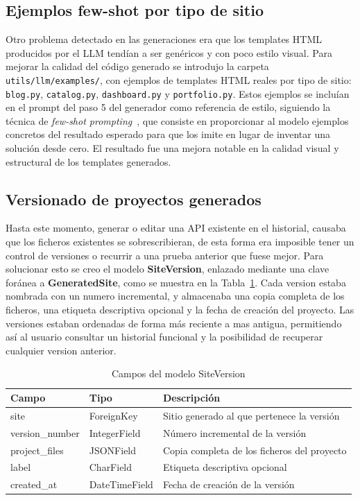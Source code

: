 \subsection{Ejemplos few-shot por tipo de sitio}
\label{subsec:ejemplos-fewshot}

Otro problema detectado en las generaciones era que los templates HTML producidos por el LLM tendían a ser genéricos y con poco estilo visual. Para mejorar la calidad del código generado se introdujo la carpeta \texttt{utils/llm/examples/}, con ejemplos de templates HTML reales por tipo de sitio: \texttt{blog.py}, \texttt{catalog.py}, \texttt{dashboard.py} y \texttt{portfolio.py}. Estos ejemplos se incluían en el prompt del paso 5 del generador como referencia de estilo, siguiendo la técnica de \emph{few-shot prompting}~\cite{openai_prompt_engineering}, que consiste en proporcionar al modelo ejemplos concretos del resultado esperado para que los imite en lugar de inventar una solución desde cero. El resultado fue una mejora notable en la calidad visual y estructural de los templates generados.


\subsection{Versionado de proyectos generados}
\label{subsec:versionado-paginas}

Hasta este momento, generar o editar una API existente en el historial, causaba que los ficheros existentes se sobrescribieran, de esta forma era imposible tener un control de versiones o recurrir a una prueba anterior que fuese mejor. Para solucionar esto se creo el modelo \textbf{SiteVersion}, enlazado mediante una clave foránea a \textbf{GeneratedSite}, como se muestra en la Tabla~\ref{tab:modelo-siteversion}. Cada version estaba nombrada con un numero incremental, y almacenaba una copia completa de los ficheros, una etiqueta descriptiva opcional y la fecha de creación del proyecto. Las versiones estaban ordenadas de forma más reciente a mas antigua, permitiendo así al usuario consultar un historial funcional y la posibilidad de recuperar cualquier version anterior.

\begin{table}[H]
    \centering
    \begin{tabular}{|l|l|p{8cm}|}
        \hline
        \textbf{Campo} & \textbf{Tipo} & \textbf{Descripción} \\
        \hline
        site & ForeignKey & Sitio generado al que pertenece la versión \\
        \hline
        version\_number & IntegerField & Número incremental de la versión \\
        \hline
        project\_files & JSONField & Copia completa de los ficheros del proyecto \\
        \hline
        label & CharField & Etiqueta descriptiva opcional \\
        \hline
        created\_at & DateTimeField & Fecha de creación de la versión \\
        \hline
    \end{tabular}
    \caption{Campos del modelo SiteVersion}
    \label{tab:modelo-siteversion}
\end{table}

